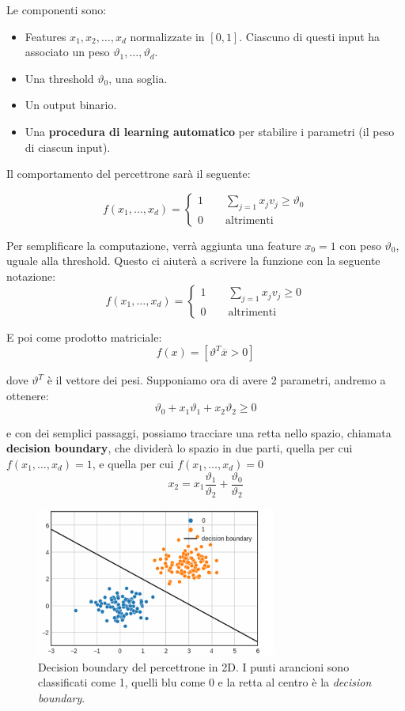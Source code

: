 \noindent
Le componenti sono:
\begin{itemize}
	\item Features $x_1, x_2, \dots, x_d$ normalizzate in $[0, 1]$. Ciascuno di questi input ha associato un peso $\vartheta_1, \dots, \vartheta_d$.
	\item Una threshold $\vartheta_0$, una soglia.
	\item Un output binario.
	\item Una \textbf{procedura di learning automatico} per stabilire i parametri (il peso di ciascun input).
\end{itemize}

\noindent
Il comportamento del percettrone sarà il seguente:

$$
f(x_1, \dots, x_d) = 
\begin{cases}
	1 \qquad \displaystyle\sum_{j=1} x_j v_j \geq \vartheta_0\\
	0 \qquad \text{altrimenti}
\end{cases}
$$

Per semplificare la computazione, verrà aggiunta una feature $x_0 = 1$ con peso $\vartheta_0$, uguale alla threshold. Questo ci aiuterà a scrivere la funzione con la seguente notazione:
$$
f(x_1, \dots, x_d) = 
\begin{cases}
	1 \qquad \displaystyle\sum_{j=1} x_j v_j \geq 0\\
	0 \qquad \text{altrimenti}
\end{cases}
$$

\noindent
E poi come prodotto matriciale:
$$
f(x) = [\vartheta^T \overline{x} > 0]
$$

\noindent
dove $\vartheta^T$ è il vettore dei pesi. Supponiamo ora di avere 2 parametri, andremo a ottenere:
$$
\vartheta_0 + x_1\vartheta_1 + x_2\vartheta_2 \geq 0
$$

e con dei semplici passaggi, possiamo tracciare una retta nello spazio, chiamata \textbf{decision boundary}, che dividerà lo spazio in due parti, quella per cui $f(x_1, \dots, x_d) = 1$, e quella per cui $f(x_1, \dots, x_d) = 0$
$$
x_2 = x_1\frac{\vartheta_1}{\vartheta_2} + \frac{\vartheta_0}{\vartheta_2}
$$

\begin{figure}[htbp]
	\centering
	\includegraphics[width=0.7\textwidth]{./images/decision_boundary.png}
	\caption{Decision boundary del percettrone in 2D. I punti arancioni sono classificati come 1, quelli blu come 0 e la retta al centro è la \emph{decision boundary}.}
	\label{fig:decisionboundary}
\end{figure}

